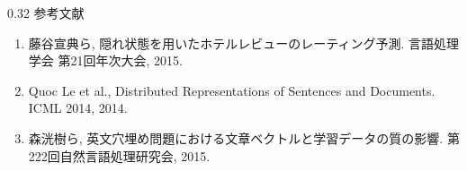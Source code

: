 \documentclass[8pt,unicode]{beamer}
\newcommand{\columnscale}{0.32}
\begin{document}
\begin{frame}{}
\begin{columns}[t]
\begin{column}{\columnscale\textwidth}
  参考文献 \\
  \begin{enumerate}
  \item 藤谷宣典ら, 隠れ状態を用いたホテルレビューのレーティング予測.
  言語処理学会 第21回年次大会, 2015. \\
  \item Quoc Le et al., Distributed Representations of Sentences and Documents.
  ICML 2014, 2014. \\
  \item 森洸樹ら, 英文穴埋め問題における文章ベクトルと学習データの質の影響.
  第222回自然言語処理研究会, 2015.
  \end{enumerate}
\end{column} %

\end{columns}
\end{frame}
\end{document}
